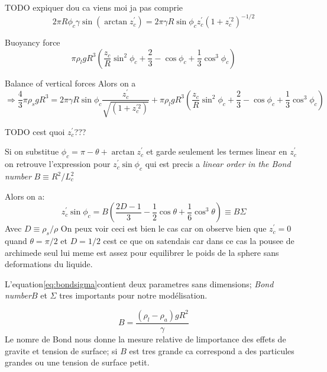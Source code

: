     TODO expiquer dou ca viens moi ja pas comprie
    \begin{equation}
        2\pi R \phi_c \gamma \sin(\arctan z_c^{'}) = 2\pi\gamma R \sin\phi_c z_c^{'}(1+z_c^{'2})^{-1/2}
        \label{eq:wut}
    \end{equation}

    Buoyancy force
    \begin{equation}
        \pi\rho_l g R^3 (\frac{z_c}{R}\sin^2 \phi_c + \frac{2}{3}-\cos\phi_c+\frac{1}{3}\cos^3 \phi_c)
        \label{eq:buoyancyForce}
    \end{equation}

    Balance of vertical forces
    Alors on a
    \begin{equation}
        \Rightarrow \frac{4}{3}\pi\rho_{s}gR^3 =2\pi\gamma R \sin\phi_c \frac{z_c^{'}}{\sqrt{(1+z_c^{'2})}} + \pi\rho_l g R^3 (\frac{z_c}{R}\sin^2 \phi_c + \frac{2}{3}-\cos\phi_c+\frac{1}{3}\cos^3 \phi_c)
    \end{equation}

    TODO cest quoi $z_c^{'}$???

    Si on substitue \(\phi_c = \pi - \theta + \arctan z_c^{'}\) et garde seulement les termes linear en \(z_c^{'}\) on retrouve l'expression pour \(z_c^{'}\sin \phi_c\) qui est precis a \textit{linear order in the Bond number} \(B \equiv R^2/L_c^2\) 

    Alors on a:
    \begin{equation}
        z_c^{'}\sin \phi_c = B(\frac{2D-1}{3}-\frac{1}{2}\cos \theta + \frac{1}{6} \cos^3 \theta) \equiv B\Sigma
        \label{eq:bondsigma}
    \end{equation}
    Avec \(D \equiv \rho_s / \rho\) On peux voir ceci est bien le cas car on observe bien que \(z_c^{'} = 0\) quand \(\theta = \pi/2\) et \(D = 1/2\) cest ce que on satendais car dans ce cas la pousee de archimede seul lui meme est assez pour equilibrer le poids de la sphere sans deformations du liquide.

    L'equation\ref{eq:bondsigma}contient deux parametres sans dimensions; \textit{Bond number}$B$ et $\Sigma$ tres importants pour notre modélisation.

    \begin{equation}
        B = \frac{(\rho_l-\rho_{a})gR^2}{\gamma}
    \end{equation}
    Le nomre de Bond nous donne la mesure relative de limportance des effets de gravite et tension de surface; si $B$ est tres grande ca correspond a des particules grandes ou une tension de surface petit. 

